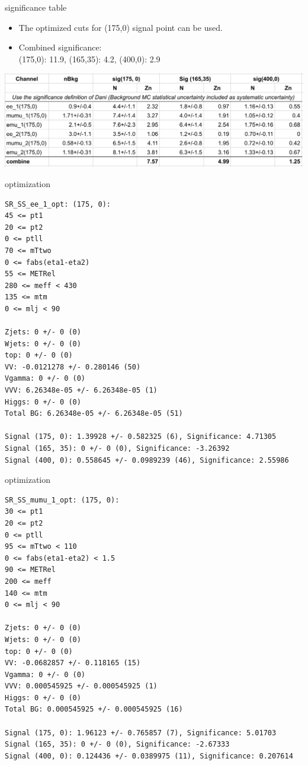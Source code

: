 \documentclass[mathserif,serif]{beamer}
\begin{document}
\begin{frame}{significance table}
\begin{itemize}
\item The optimized cuts for (175,0) signal point can be used.
\item Combined significance: \\
(175,0): 11.9, (165,35): 4.2, (400,0): 2.9
\end{itemize}
\includegraphics[width=\textwidth]{data/optimization/dongliang.png}
\end{frame}

\begin{frame}[fragile]{optimization}
\tiny
\begin{verbatim}
SR_SS_ee_1_opt: (175, 0):
45 <= pt1
20 <= pt2
0 <= ptll
70 <= mTtwo
0 <= fabs(eta1-eta2)
55 <= METRel
280 <= meff < 430
135 <= mtm
0 <= mlj < 90

Zjets: 0 +/- 0 (0)
Wjets: 0 +/- 0 (0)
top: 0 +/- 0 (0)
VV: -0.0121278 +/- 0.280146 (50)
Vgamma: 0 +/- 0 (0)
VVV: 6.26348e-05 +/- 6.26348e-05 (1)
Higgs: 0 +/- 0 (0)
Total BG: 6.26348e-05 +/- 6.26348e-05 (51)

Signal (175, 0): 1.39928 +/- 0.582325 (6), Significance: 4.71305
Signal (165, 35): 0 +/- 0 (0), Significance: -3.26392
Signal (400, 0): 0.558645 +/- 0.0989239 (46), Significance: 2.55986
\end{verbatim}
\end{frame}

\begin{frame}[fragile]{optimization}
\tiny
\begin{verbatim}
SR_SS_mumu_1_opt: (175, 0):
30 <= pt1
20 <= pt2
0 <= ptll
95 <= mTtwo < 110
0 <= fabs(eta1-eta2) < 1.5
90 <= METRel
200 <= meff
140 <= mtm
0 <= mlj < 90

Zjets: 0 +/- 0 (0)
Wjets: 0 +/- 0 (0)
top: 0 +/- 0 (0)
VV: -0.0682857 +/- 0.118165 (15)
Vgamma: 0 +/- 0 (0)
VVV: 0.000545925 +/- 0.000545925 (1)
Higgs: 0 +/- 0 (0)
Total BG: 0.000545925 +/- 0.000545925 (16)

Signal (175, 0): 1.96123 +/- 0.765857 (7), Significance: 5.01703
Signal (165, 35): 0 +/- 0 (0), Significance: -2.67333
Signal (400, 0): 0.124436 +/- 0.0389975 (11), Significance: 0.207614
\end{verbatim}
\end{frame}
\end{document}
